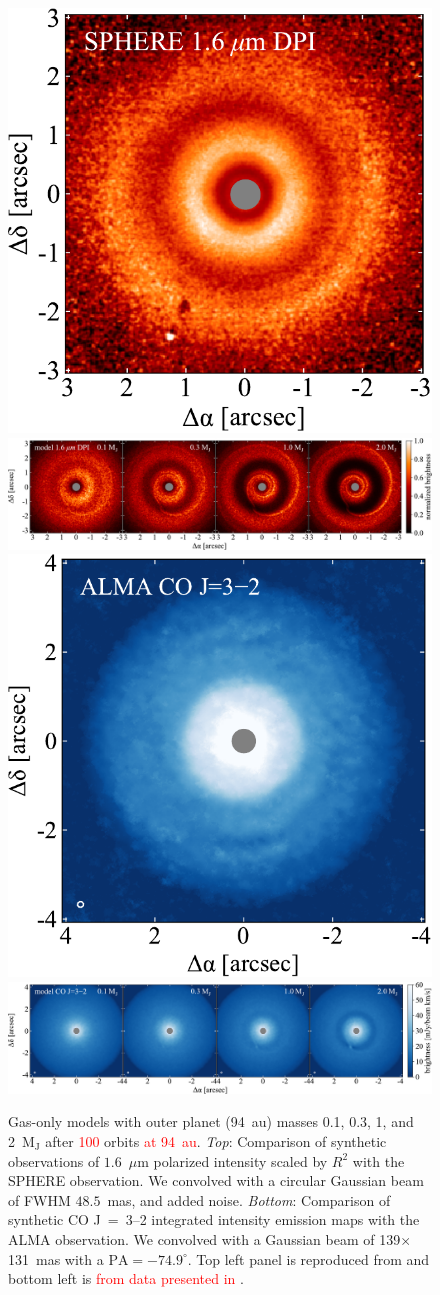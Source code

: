 \documentclass[usenatbib,a4paper,times]{mnras}
\newcommand{\new}[1]{{\textcolor{red}{#1}}}
\begin{document}
\begin{figure}
   \begin{center}
      \includegraphics[height=0.205\textwidth]{figs/van-boekel-2017.pdf} \quad
      \includegraphics[height=0.205\textwidth]{figs/scattered-image.pdf}
      \includegraphics[height=0.203\textwidth]{figs/huang-2018.pdf} \quad
      \includegraphics[height=0.203\textwidth]{figs/CO-image.pdf}
      \caption{Gas-only models with outer planet (94~au) masses 0.1, 0.3, 1, and
         2~$\mathrm{M_J}$ after \new{100} orbits \new{at 94~au}. \textit{Top}:
         Comparison of synthetic observations of $1.6$~$\mu$m polarized
         intensity scaled by $R^2$ with the SPHERE observation. We convolved
         with a circular Gaussian beam of FWHM $48.5$~mas, and added
         noise. \textit{Bottom}: Comparison of synthetic CO J~=~3--2
         integrated intensity emission maps with the ALMA observation. We
         convolved with a Gaussian beam of 139$\times$131~mas with a
         $\mathrm{PA} = -74.9^{\circ}$. Top left panel is reproduced from
         \citet{van-boekel:2017} and bottom left is \new{from data presented
         in} \citet{huang:2018}.\label{fig:scattered-CO}}
   \end{center}
\end{figure}
\end{document}
